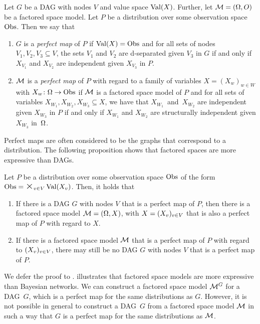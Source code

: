 \documentclass[USenglish,onecolumn]{article}
\begin{document}
\begin{definition} Let $G$ be a DAG with nodes $V$ and value space $\textnormal{Val}(X)$. Further, let $\mathcal{M}=(\Omega, O)$ 
be a factored space model. Let $P$ be a distribution over some observation space ${\textnormal{Obs}}$. Then we say that
\begin{enumerate}
    \item $G$ is a \emph{perfect map} of $P$ if  $\textnormal{Val}(X)={\textnormal{Obs}}$ and for all sets of nodes $V_1, V_2, V_3\subseteq V$, the sets $V_1$ and $V_2$ are d-separated given $V_3$ in $G$ if and only if $X_{V_1}$ and $X_{V_2}$ are independent given $X_{V_3}$ in $P$.
    \item $\mathcal{M}$ is a \emph{perfect map} of $P$ with regard to a family of variables $X=(X_w)_{w\in W}$ with $X_w\colon \Omega \to {\textnormal{Obs}}$ if $\mathcal{M}$ is a factored space model of $P$ and for all sets of variables $X_{W_1},X_{W_2}, X_{W_3} \subseteq X$, we have that $X_{W_1}$~and~$X_{W_2}$ are independent given $X_{W_3}$ in $P$ if and only if $X_{W_1}$ and $X_{W_2}$ are structurally independent given $X_{W_3}$ in~$\Omega$.
\end{enumerate}
\end{definition}
Perfect maps are often considered to be the graphs that correspond to a distribution. The following proposition shows that factored spaces are more expressive than DAGs.

\begin{proposition}
\label{prop:perfectmap}
    Let $P$ be a distribution over some observation space ${\textnormal{Obs}}$ of the form $\Obs=\timesbig_\vinV \Val(X_v)$. Then, it holds that
    \begin{enumerate}
        \item  If there is a DAG $G$ with nodes $V$ that is a perfect map of $P$, then there is a factored space model $\mathcal{M}=(\Omega, X)$, with $X=(X_v)_{v\in V}$ that is also a perfect map of $P$ with regard to $X$.
        \item If there is a factored space model $\mathcal{M}$ that is a perfect map of $P$ with regard to $(X_v)_{v\in V} $, there may still be no DAG $G$ with nodes $V$ that is a perfect map of $P$.
    \end{enumerate}
\end{proposition}
We defer the proof to .
 illustrates that factored space models are more expressive than Bayesian networks. We can construct a factored space model $\mathcal{M}^G$ for a DAG~$G$, which is a perfect map for the same distributions as $G$. However, it is not possible in general to construct a DAG~$G$ from a factored space model $\mathcal{M}$ in such a way that $G$ is a perfect map for the same distributions as $\mathcal{M}$.
\end{document}

